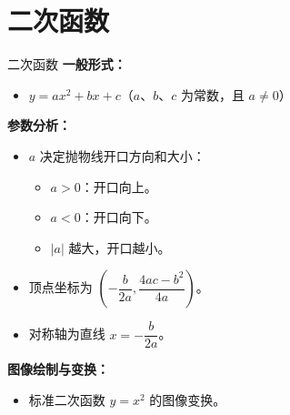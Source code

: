 \documentclass[aspectratio=169]{ctexbeamer} %
\begin{document}
\section{二次函数}

\begin{frame}{二次函数}
    \textbf{一般形式：}
    \begin{itemize}
        \item \( y = ax^2 + bx + c \)（\( a \)、\( b \)、\( c \) 为常数，且 \( a \neq 0 \)）
    \end{itemize}

    \vspace{0.5cm}
    \textbf{参数分析：}
    \begin{itemize}
        \item \( a \) 决定抛物线开口方向和大小：
        \begin{itemize}
            \item \( a > 0 \)：开口向上。
            \item \( a < 0 \)：开口向下。
            \item \( |a| \) 越大，开口越小。
        \end{itemize}
        \item 顶点坐标为 \( \left( -\dfrac{b}{2a}, \dfrac{4ac - b^2}{4a} \right) \)。
        \item 对称轴为直线 \( x = -\dfrac{b}{2a} \)。
    \end{itemize}

    \vspace{0.5cm}
    \textbf{图像绘制与变换：}
    \begin{itemize}
        \item 标准二次函数 \( y = x^2 \) 的图像变换。
    \end{itemize}
\end{frame}
\end{document}
